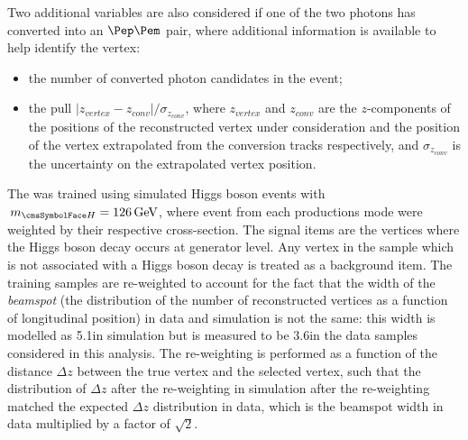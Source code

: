 Two additional variables are also considered if one of the two photons has converted into an $\Pep\Pem$ pair, where additional information is available to help identify the vertex:
\begin{itemize}
\item the number of converted photon candidates in the event;
\item the pull $|z_{vertex} - z_{conv}|/\sigma_{z_{conv}} $, where $z_{vertex}$ and $ z_{conv}$ are the $z$-components of the positions of the reconstructed vertex under consideration  and the position of the vertex extrapolated from the conversion tracks respectively, and $\sigma_{z_{conv}} $ is the uncertainty on the extrapolated vertex position.
\end{itemize}

The \VtxIdBdt was trained using simulated Higgs boson events with $\mH=126\GeV$, where event from each productions mode were weighted by their respective cross-section. The signal items are the vertices where the Higgs boson decay occurs at generator level. Any vertex in the sample which is not associated with a Higgs boson decay is treated as a background item. The training samples are re-weighted to account for the fact that the width of the \emph{beamspot} (the distribution of the number of reconstructed vertices as a function of longitudinal position) in data and simulation is not the same: this width is modelled as 5.1\cm in simulation but is measured to be 3.6\cm in the data samples considered in this analysis. The re-weighting is performed as a function of the distance $\Delta z$ between the true vertex and the selected vertex, such that the distribution of $\Delta z$ after the re-weighting in simulation after the re-weighting matched the expected $\Delta z$ distribution in data, which is the beamspot width in data multiplied by a factor of $\sqrt{2}$.

